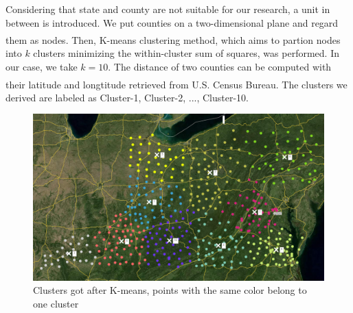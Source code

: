 \documentclass[11pt]{article}
\newcommand{\upcite}[1]{\textsuperscript{\textsuperscript{\cite{#1}}}}
\begin{document}
Considering that state and county are not suitable for our research, a unit in between is introduced. We put counties on a two-dimensional plane and regard them as nodes. Then, K-means clustering method\upcite{1}, which aims to partion nodes into $k$ clusters minimizing the within-cluster sum of squares, was performed. In our case, we take $k = 10$. The distance of two counties can be computed with their latitude and longtitude retrieved from U.S. Census Bureau\upcite{2}. The clusters we derived are labeled as Cluster-1, Cluster-2, ..., Cluster-10.
\begin{figure}[H]
	\centering
	\includegraphics[scale=0.3]{./figures/0.png}
	\caption{Clusters got after K-means, points with the same color belong to one cluster}
	\label{Fig0}
\end{figure}
\end{document}
